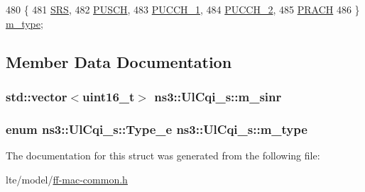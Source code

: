 \begin{DoxyCode}
480   \{
481     \hyperlink{structns3_1_1UlCqi__s_aece9e5ebea42eb9ff1744c72c8459b57af4b6dba4243636562c910c4d4761dd7e}{SRS},
482     \hyperlink{structns3_1_1UlCqi__s_aece9e5ebea42eb9ff1744c72c8459b57a9716b20a3095c473ae3fde1eb5d0bb63}{PUSCH},
483     \hyperlink{structns3_1_1UlCqi__s_aece9e5ebea42eb9ff1744c72c8459b57a05ca6554bc6fcd96a0a51fbaa8e794c7}{PUCCH\_1},
484     \hyperlink{structns3_1_1UlCqi__s_aece9e5ebea42eb9ff1744c72c8459b57a35664b4bda6f1cd6acfe9edc84c7571d}{PUCCH\_2},
485     \hyperlink{structns3_1_1UlCqi__s_aece9e5ebea42eb9ff1744c72c8459b57af93f36792cb1eed08f6119e4abfe58e8}{PRACH}
486   \} \hyperlink{structns3_1_1UlCqi__s_a65a50b31dea8123fb77cf2994fb4601d}{m\_type};
\end{DoxyCode}


\subsection{Member Data Documentation}
\subsubsection[{\texorpdfstring{m\+\_\+sinr}{m_sinr}}]{\setlength{\rightskip}{0pt plus 5cm}std\+::vector$<$uint16\+\_\+t$>$ ns3\+::\+Ul\+Cqi\+\_\+s\+::m\+\_\+sinr}\hypertarget{structns3_1_1UlCqi__s_ab561bf996ff15ef06eddc1d8fcf6303d}{}\label{structns3_1_1UlCqi__s_ab561bf996ff15ef06eddc1d8fcf6303d}
\subsubsection[{\texorpdfstring{m\+\_\+type}{m_type}}]{\setlength{\rightskip}{0pt plus 5cm}enum {\bf ns3\+::\+Ul\+Cqi\+\_\+s\+::\+Type\+\_\+e}  ns3\+::\+Ul\+Cqi\+\_\+s\+::m\+\_\+type}\hypertarget{structns3_1_1UlCqi__s_a65a50b31dea8123fb77cf2994fb4601d}{}\label{structns3_1_1UlCqi__s_a65a50b31dea8123fb77cf2994fb4601d}


The documentation for this struct was generated from the following file\+:\begin{DoxyCompactItemize}
\item 
lte/model/\hyperlink{ff-mac-common_8h}{ff-\/mac-\/common.\+h}\end{DoxyCompactItemize}
